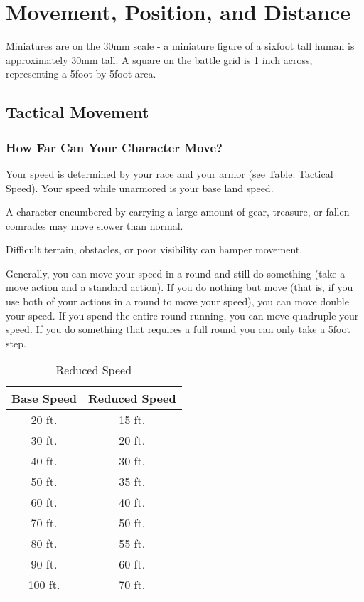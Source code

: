 \section{Movement, Position, and Distance}

Miniatures are on the 30mm scale - a miniature figure of a six\textendash foot tall human is approximately 30mm tall. A square on the battle grid is 1 inch across, representing a 5\textendash foot by 5\textendash foot area.

\subsection{Tactical Movement}

\subsubsection{How Far Can Your Character Move?}

Your speed is determined by your race and your armor (see Table: Tactical Speed). Your speed while unarmored is your base land speed.

\vspace*{10pt}

A character encumbered by carrying a large amount of gear, treasure, or fallen comrades may move slower than normal.  

Difficult terrain, obstacles, or poor visibility can hamper movement.

Generally, you can move your speed in a round and still do something (take a move action and a standard action).
If you do nothing but move (that is, if you use both of your actions in a round to move your speed), you can move double your speed.
If you spend the entire round running, you can move quadruple your speed. If you do something that requires a full round you can only take a 5\textendash foot step.

\begin{wraptable}{o}{2in}
\caption{Reduced Speed}
\begin{tabular}[h]{c|c}
Base Speed & Reduced Speed \\ \hline
20 ft. & 15 ft. \\
30 ft. & 20 ft. \\
40 ft. & 30 ft. \\
50 ft. & 35 ft. \\
60 ft. & 40 ft. \\
70 ft. & 50 ft. \\
80 ft. & 55 ft. \\
90 ft. & 60 ft. \\
100 ft. & 70 ft. \\
\end{tabular}
\end{wraptable}

